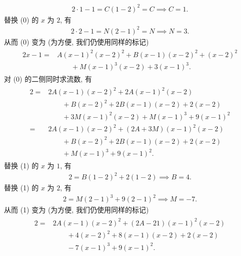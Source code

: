 \begin{example}
\begin{align*}
        2 \cdot 1 - 1 = C (1 - 2)^2 = C \implies C = 1.
    \end{align*}
    替换 (0) 的 $x$ 为 $2$, 有
    \begin{align*}
        2 \cdot 2 - 1 = N (2 - 1)^2 = N \implies N = 3.
    \end{align*}
    从而 (0) 变为 (为方便, 我们仍使用同样的标记)
    \begin{align*}
        \tag*{(0)} \begin{aligned}
            2x - 1
            = {} & A (x - 1)^2 (x - 2)^2 + B (x - 1) (x - 2)^2 + (x - 2)^2 \\
                 & \qquad + M (x - 1)^3 (x - 2) + 3 (x - 1)^3.
        \end{aligned}
    \end{align*}
    对 (0) 的二侧同时求流数, 有
    \begin{align*}
        \tag*{(1)} \begin{aligned}
            2
            = {} & 2A (x - 1) (x - 2)^2 + 2A (x - 1)^2 (x - 2)              \\
                 & \qquad + B (x - 2)^2 + 2B (x - 1) (x - 2) + 2(x - 2)     \\
                 & \qquad + 3M (x - 1)^2 (x - 2) + M(x - 1)^3 + 9 (x - 1)^2 \\
            = {} & 2A (x - 1) (x - 2)^2 + (2A + 3M) (x - 1)^2 (x - 2)       \\
                 & \qquad + B (x - 2)^2 + 2B (x - 1) (x - 2) + 2(x - 2)     \\
                 & \qquad + M(x - 1)^3 + 9 (x - 1)^2.
        \end{aligned}
    \end{align*}
    替换 (1) 的 $x$ 为 $1$, 有
    \begin{align*}
        2 = B (1 - 2)^2 + 2 (1 - 2) \implies B = 4.
    \end{align*}
    替换 (1) 的 $x$ 为 $2$, 有
    \begin{align*}
        2 = M (2 - 1)^3 + 9 (2 - 1)^2 \implies M = -7.
    \end{align*}
    从而 (1) 变为 (为方便, 我们仍使用同样的标记)
    \begin{align*}
        \tag*{(1)} \begin{aligned}
            2
            = {} & 2A (x - 1) (x - 2)^2 + (2A - 21) (x - 1)^2 (x - 2)  \\
                 & \qquad + 4 (x - 2)^2 + 8 (x - 1) (x - 2) + 2(x - 2) \\
                 & \qquad - 7(x - 1)^3 + 9 (x - 1)^2.

\end{aligned}
\end{align*}
\end{example}
